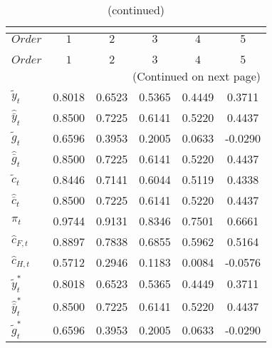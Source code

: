  
\begin{center}
\begin{longtable}{lccccc} 
\caption{COEFFICIENTS OF AUTOCORRELATION}\\
 \label{Table:th_autocorr_matrix}\\
\toprule 
$Order                $	 & 	 $         1$	 & 	 $         2$	 & 	 $         3$	 & 	 $         4$	 & 	 $         5$\\
\midrule \endfirsthead 
\caption{(continued)}\\
 \toprule \\ 
$Order                $	 & 	 $         1$	 & 	 $         2$	 & 	 $         3$	 & 	 $         4$	 & 	 $         5$\\
\midrule \endhead 
\midrule \multicolumn{6}{r}{(Continued on next page)} \\ \bottomrule \endfoot 
\bottomrule \endlastfoot 
${\tilde y_t}         $	 & 	    0.8018	 & 	    0.6523	 & 	    0.5365	 & 	    0.4449	 & 	    0.3711 \\ 
${\hat {\bar y}_t}    $	 & 	    0.8500	 & 	    0.7225	 & 	    0.6141	 & 	    0.5220	 & 	    0.4437 \\ 
${\tilde g_t}         $	 & 	    0.6596	 & 	    0.3953	 & 	    0.2005	 & 	    0.0633	 & 	   -0.0290 \\ 
${\hat {\bar g}_t}    $	 & 	    0.8500	 & 	    0.7225	 & 	    0.6141	 & 	    0.5220	 & 	    0.4437 \\ 
${\tilde c_t}         $	 & 	    0.8446	 & 	    0.7141	 & 	    0.6044	 & 	    0.5119	 & 	    0.4338 \\ 
${\hat {\bar c}_t}    $	 & 	    0.8500	 & 	    0.7225	 & 	    0.6141	 & 	    0.5220	 & 	    0.4437 \\ 
${\pi_t}              $	 & 	    0.9744	 & 	    0.9131	 & 	    0.8346	 & 	    0.7501	 & 	    0.6661 \\ 
${\hat c_{F,t}}       $	 & 	    0.8897	 & 	    0.7838	 & 	    0.6855	 & 	    0.5962	 & 	    0.5164 \\ 
${\hat c_{H,t}}       $	 & 	    0.5712	 & 	    0.2946	 & 	    0.1183	 & 	    0.0084	 & 	   -0.0576 \\ 
${\tilde y_t^*}       $	 & 	    0.8018	 & 	    0.6523	 & 	    0.5365	 & 	    0.4449	 & 	    0.3711 \\ 
${\hat {\bar y}_t^*}  $	 & 	    0.8500	 & 	    0.7225	 & 	    0.6141	 & 	    0.5220	 & 	    0.4437 \\ 
${\tilde g_t^*}       $	 & 	    0.6596	 & 	    0.3953	 & 	    0.2005	 & 	    0.0633	 & 	   -0.0290 \\ 

\end{longtable}
\end{center}

